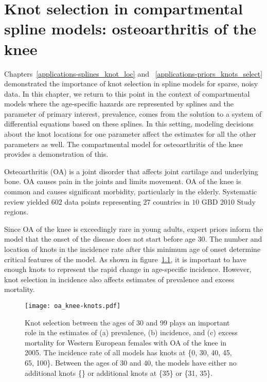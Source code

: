 \chapter{Knot selection in compartmental spline models: osteoarthritis of the knee}
\label{applications-con_fit_splines}

Chapters~\ref{applications-splines_knot_loc} and
~\ref{applications-priors_knots_select} demonstrated the importance of
knot selection in spline models for sparse, noisy data. In this
chapter, we return to this point in the context of compartmental
models where the age-specific hazards are represented by splines and
the parameter of primary interest, prevalence, comes from the solution
to a system of differential equations based on these splines. In this
setting, modeling decisions about the knot locations for one parameter
affect the estimates for all the other parameters as well.  The
compartmental model for osteoarthritis of the knee provides a
demonstration of this.

Osteoarthritis (OA) is a joint disorder that affects joint cartilage and
underlying bone.  OA causes pain in the joints and limits movement.
OA of the knee is common and causes significant
morbidity, particularly in the
elderly. \cite{felson_epidemiology_1988, felson_incidence_1995}
Systematic review yielded $602$ data points representing $27$ countries
in $10$ GBD 2010 Study regions.

Since OA of the knee is exceedingly rare in young adults, expert priors inform the
model that the onset of the disease does not start before age 30.  The
number and location of knots in the incidence rate after this minimum
age of onset determine critical features of the model. As shown in
figure~\ref{fig:app-oa knee knots}, it is important to have enough
knots to represent the rapid change in age-specific incidence.
However, knot selection in incidence also affects estimates of
prevalence and excess mortality.

    \begin{figure}[h]
        \begin{center}
            \texttt{[image: oa\_knee-knots.pdf]}
            \caption[Comparison of osteoarthritis of the knee estimates 
              using a compartmental model with different knot selections.]{Knot 
              selection between the ages of 30 and 99
              plays an important role in the estimates of
              (a) prevalence, (b) incidence, and
              (c) excess mortality
              for Western European females
              with OA of the knee in 2005.  The
              incidence rate of all models has knots at \{0, 30,
              40, 45, 65, 100\}.  Between the ages
              of 30 and 40, the models have either no additional knots \{\} or additional knots at \{35\}
              or \{31, 35\}.}
            \label{fig:app-oa knee knots}
        \end{center}
    \end{figure}

